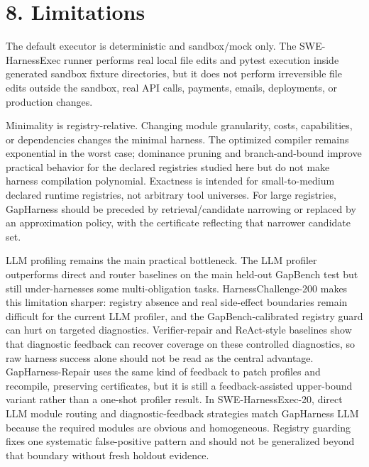 \documentclass[
  10pt,
]{article}
\begin{document}
\section{8. Limitations}\label{limitations}

The default executor is deterministic and sandbox/mock only. The
SWE-HarnessExec runner performs real local file edits and pytest
execution inside generated sandbox fixture directories, but it does not
perform irreversible file edits outside the sandbox, real API calls,
payments, emails, deployments, or production changes.

Minimality is registry-relative. Changing module granularity, costs,
capabilities, or dependencies changes the minimal harness. The optimized
compiler remains exponential in the worst case; dominance pruning and
branch-and-bound improve practical behavior for the declared registries
studied here but do not make harness compilation polynomial. Exactness
is intended for small-to-medium declared runtime registries, not
arbitrary tool universes. For large registries, GapHarness should be
preceded by retrieval/candidate narrowing or replaced by an
approximation policy, with the certificate reflecting that narrower
candidate set.

LLM profiling remains the main practical bottleneck. The LLM profiler
outperforms direct and router baselines on the main held-out GapBench
test but still under-harnesses some multi-obligation tasks.
HarnessChallenge-200 makes this limitation sharper: registry absence and
real side-effect boundaries remain difficult for the current LLM
profiler, and the GapBench-calibrated registry guard can hurt on
targeted diagnostics. Verifier-repair and ReAct-style baselines show
that diagnostic feedback can recover coverage on these controlled
diagnostics, so raw harness success alone should not be read as the
central advantage. GapHarness-Repair uses the same kind of feedback to
patch profiles and recompile, preserving certificates, but it is still a
feedback-assisted upper-bound variant rather than a one-shot profiler
result. In SWE-HarnessExec-20, direct LLM module routing and
diagnostic-feedback strategies match GapHarness LLM because the required
modules are obvious and homogeneous. Registry guarding fixes one
systematic false-positive pattern and should not be generalized beyond
that boundary without fresh holdout evidence.
\end{document}

